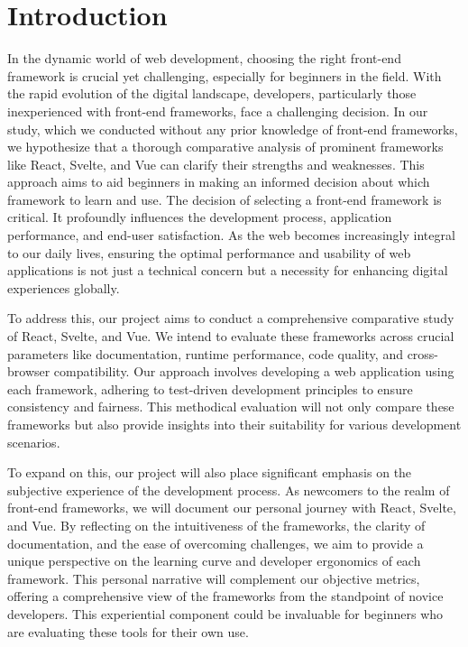 \section{Introduction}

In the dynamic world of web development, choosing the right front-end framework is crucial yet challenging, especially for beginners in the field. With the rapid evolution of the digital landscape, developers, particularly those inexperienced with front-end frameworks, face a challenging decision. In our study, which we conducted without any prior knowledge of front-end frameworks, we hypothesize that a thorough comparative analysis of prominent frameworks like React, Svelte, and Vue can clarify their strengths and weaknesses. This approach aims to aid beginners in making an informed decision about which framework to learn and use.
The decision of selecting a front-end framework is critical. It profoundly influences the development process, application performance, and end-user satisfaction. As the web becomes increasingly integral to our daily lives, ensuring the optimal performance and usability of web applications is not just a technical concern but a necessity for enhancing digital experiences globally.

To address this, our project aims to conduct a comprehensive comparative study of React, Svelte, and Vue. We intend to evaluate these frameworks across crucial parameters like documentation, runtime performance, code quality, and cross-browser compatibility. Our approach involves developing a web application using each framework, adhering to test-driven development principles to ensure consistency and fairness. This methodical evaluation will not only compare these frameworks but also provide insights into their suitability for various development scenarios. 

To expand on this, our project will also place significant emphasis on the subjective experience of the development process. As newcomers to the realm of front-end frameworks, we will document our personal journey with React, Svelte, and Vue. By reflecting on the intuitiveness of the frameworks, the clarity of documentation, and the ease of overcoming challenges, we aim to provide a unique perspective on the learning curve and developer ergonomics of each framework. This personal narrative will complement our objective metrics, offering a comprehensive view of the frameworks from the standpoint of novice developers. This experiential component could be invaluable for beginners who are evaluating these tools for their own use.
